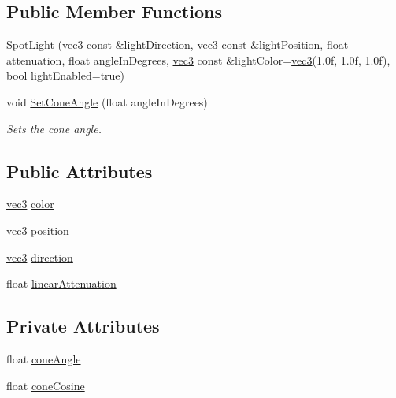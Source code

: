 \subsection*{Public Member Functions}
\begin{DoxyCompactItemize}
\item 
\hyperlink{struct_spot_light_ade2739079d666cb447290e6f85404a28}{Spot\+Light} (\hyperlink{_types_8h_a3d0ce73e3199de81565fb01632415288}{vec3} const \&light\+Direction, \hyperlink{_types_8h_a3d0ce73e3199de81565fb01632415288}{vec3} const \&light\+Position, float attenuation, float angle\+In\+Degrees, \hyperlink{_types_8h_a3d0ce73e3199de81565fb01632415288}{vec3} const \&light\+Color=\hyperlink{_types_8h_a3d0ce73e3199de81565fb01632415288}{vec3}(1.\+0f, 1.\+0f, 1.\+0f), bool light\+Enabled=true)
\item 
void \hyperlink{struct_spot_light_a8c7ae45104d1e9c394717447b65a4bbd}{Set\+Cone\+Angle} (float angle\+In\+Degrees)
\begin{DoxyCompactList}\small\item\em Sets the cone angle. \end{DoxyCompactList}\end{DoxyCompactItemize}
\subsection*{Public Attributes}
\begin{DoxyCompactItemize}
\item 
\hyperlink{_types_8h_a3d0ce73e3199de81565fb01632415288}{vec3} \hyperlink{struct_spot_light_ae1426c92b7130b3a608a5aa4a0a814cb}{color}
\item 
\hyperlink{_types_8h_a3d0ce73e3199de81565fb01632415288}{vec3} \hyperlink{struct_spot_light_a707173cf04742ea60c140e1de36dc90a}{position}
\item 
\hyperlink{_types_8h_a3d0ce73e3199de81565fb01632415288}{vec3} \hyperlink{struct_spot_light_a0cc8dadd5f22dc604538ddf849c088dc}{direction}
\item 
float \hyperlink{struct_spot_light_a8c45a82ddf692a1b23c50aad68cb7dd6}{linear\+Attenuation}
\end{DoxyCompactItemize}
\subsection*{Private Attributes}
\begin{DoxyCompactItemize}
\item 
float \hyperlink{struct_spot_light_a03cf00fdd6b15023ea1ac5d2be65e591}{cone\+Angle}
\item 
float \hyperlink{struct_spot_light_a6f02787ffab5a7b5e95b30b3353ad0ed}{cone\+Cosine}
\end{DoxyCompactItemize}
